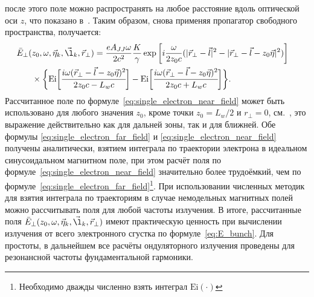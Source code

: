 после этого поле можно распространять на любое расстояние вдоль оптической оси $z$, что показано в~\cite{geloni_fourier_2007}. Таким образом, снова применяя пропагатор свободного пространства, получается:
\begin{align}
	\bar{E}_{\bot}(&z_0, \omega, \vec{\eta}_k, \vec{\l}_k, \vec{r}_{\bot}) =
		\frac{e A_{JJ} \omega}{2 c^2}\frac{K}{\gamma} \exp{\bigg[i \frac{\omega}{2 z_0 c} (|\vec{r}_{\bot} - \vec{l}|^2 - |\vec{r}_{\bot} - \vec{l} - z_0 \vec{\eta}|^2) \bigg]} \cr & \times	\bigg \{ \text{Ei} \bigg[ \cfrac{i \omega (\vec{r}_{\bot} - \vec{l} - z_0 \vec{\eta})^2}{2z_0c - L_w c}\bigg] - \text{Ei} \bigg[ \cfrac{i \omega (\vec{r}_{\bot} - \vec{l} - z_0 \vec{\eta})^2}{2z_0c + L_w c} \bigg] \bigg\}.
	\label{eq:single_electron_near_field}
\end{align}
Рассчитанное поле по формуле~\ref{eq:single_electron_near_field} может быть использовано для любого значения $z_0$, кроме точки $z_0 = L_w/2$ и $r_{\bot} = 0$, см.~\cite{geloni_fourier_2007}, это выражение действительно как для дальней зоны, так и для ближней. Обе формулы \ref{eq:single_electron_far_field} и \ref{eq:single_electron_near_field} получены аналитически, взятием интеграла по траектории электрона в идеальном синусоидальном магнитном поле, при этом расчёт поля по формуле~\ref{eq:single_electron_near_field} значительно более трудоёмкий, чем по формуле~\ref{eq:single_electron_far_field}\footnote{Необходимо дважды численно взять интеграл $\text{Ei}(\cdot)$}. При использовании численных методик для взятия интеграла по траекториям в случае немодельных магнитных полей можно рассчитывать поля для любой частоты излучения. В итоге, рассчитанные поля $\bar{E}_{\bot}(z_0, \omega, \vec{\eta}_k, \vec{\l}_k, \vec{r}_{\bot})$ имеют практическую ценность при вычислении излучения от всего электронного сгустка по формуле~\ref{eq:E_bunch}. Для простоты, в дальнейшем все расчёты ондуляторного излучения проведены для резонансной частоты фундаментальной гармоники.
 
